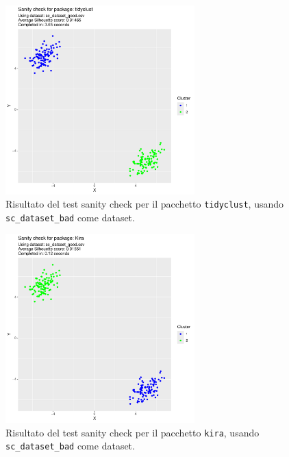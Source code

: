 \documentclass[a4paper, 12pt]{report}
\begin{document}
			\begin{figure}[H]
				\centering
				\includegraphics[width = 0.65\textwidth, page = 2]{results/results_TIDYCLUST.pdf}
				\caption{Risultato del test sanity check per il pacchetto \texttt{tidyclust}, usando \texttt{sc\_dataset\_bad} come dataset.}
				\label{fig:tidyclustbad}
			\end{figure}

			\begin{figure}[H]
				\centering
				\includegraphics[width = 0.65\textwidth, page = 2]{results/results_KIRA.pdf}
				\caption{Risultato del test sanity check per il pacchetto \texttt{kira}, usando \texttt{sc\_dataset\_bad} come dataset.}
				\label{fig:kirabad}
			\end{figure}
			
\end{document}
